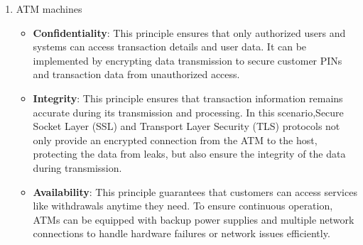 \documentclass{article}
\begin{document}
\begin{enumerate}
    \item ATM machines
        \begin{itemize}
            \item \textbf{Confidentiality}: This principle ensures that only authorized users and systems can access transaction details and user data\cite{Lecture1}. It can be implemented by encrypting data transmission to secure customer PINs and transaction data from unauthorized access.
            \item \textbf{Integrity}: This principle ensures that transaction information remains accurate during its transmission and processing\cite{Lecture1}. In this scenario,Secure Socket Layer (SSL) and Transport Layer Security (TLS) \cite{TritonSSLProject}protocols not only provide an encrypted connection from the ATM to the host, protecting the data from leaks, but also ensure the integrity of the data during transmission.
            \item \textbf{Availability}: This principle guarantees that customers can access services like withdrawals anytime they need\cite{Lecture1}. To ensure continuous operation, ATMs can be equipped with backup power supplies and multiple network connections to handle hardware failures or network issues efficiently.
        \end{itemize}
\end{enumerate}
\end{document}
